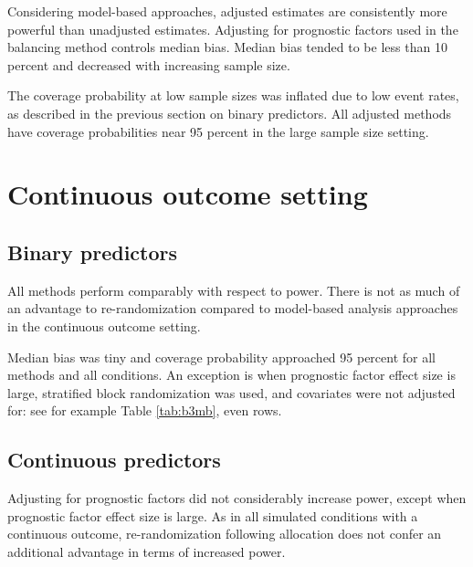 Considering model-based approaches, adjusted estimates are consistently more powerful than unadjusted estimates. 
Adjusting for prognostic factors used in the balancing method controls median bias.
Median bias tended to be less than 10 percent and decreased with increasing sample size.

The coverage probability at low sample sizes was inflated due to low event rates, as described in the previous section on binary predictors.
All adjusted methods have coverage probabilities near 95 percent in the large sample size setting. 

\section{Continuous outcome setting}
\subsection{Binary predictors}
All methods perform comparably with respect to power. 
There is not as much of an advantage to re-randomization compared to model-based analysis approaches in the continuous outcome setting.

Median bias was tiny and coverage probability approached 95 percent for all methods and all conditions.
An exception is when prognostic factor effect size is large, stratified block randomization was used, and covariates were not adjusted for: see for example Table \ref{tab:b3mb}, even rows.

\subsection{Continuous predictors}
Adjusting for prognostic factors did not considerably increase power, except when prognostic factor effect size is large.
As in all simulated conditions with a continuous outcome, re-randomization following allocation does not confer an additional advantage in terms of increased power.